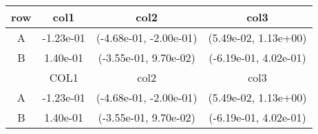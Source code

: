 \begin{tabular}{cccc}
\toprule
row&col1&col2&col3\tabularnewline
\midrule
A&-1.23e-01& (-4.68e-01, -2.00e-01)& (5.49e-02, 1.13e+00)\tabularnewline
B&1.40e-01& (-3.55e-01, 9.70e-02)& (-6.19e-01, 4.02e-01)\tabularnewline
\midrule
&COL1&col2&col3\tabularnewline
\midrule
A&-1.23e-01& (-4.68e-01, -2.00e-01)& (5.49e-02, 1.13e+00)\tabularnewline
B&1.40e-01& (-3.55e-01, 9.70e-02)& (-6.19e-01, 4.02e-01)\tabularnewline
\bottomrule
\end{tabular}
